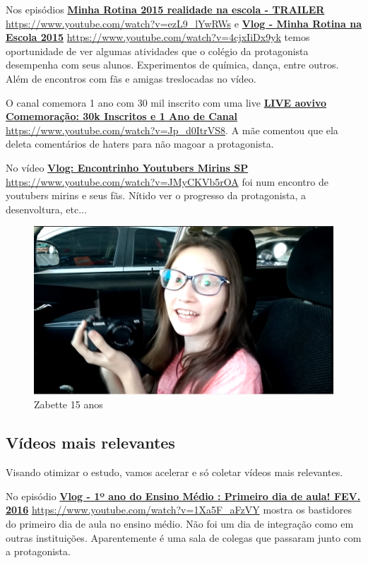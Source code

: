 Nos episódios \href{https://www.youtube.com/watch?v=ezL9_lYwRWs}{\textbf{Minha Rotina 2015 realidade na escola - TRAILER}} \url{https://www.youtube.com/watch?v=ezL9_lYwRWs} e \href{https://www.youtube.com/watch?v=4cjxIiDx9yk}{\textbf{Vlog - Minha Rotina na Escola 2015}} \url{https://www.youtube.com/watch?v=4cjxIiDx9yk} temos oportunidade de ver algumas atividades que o colégio da protagonista desempenha com seus alunos. Experimentos de química, dança, entre outros. Além de encontros com fãs e amigas treslocadas no vídeo.

O canal comemora 1 ano com 30 mil inscrito com uma live \href{https://www.youtube.com/watch?v=Jp_d0ItrVS8}{\textbf{LIVE aovivo Comemoração: 30k Inscritos e 1 Ano de Canal}} \url{https://www.youtube.com/watch?v=Jp_d0ItrVS8}. A mãe comentou que ela deleta comentários de haters para não magoar a protagonista.

No vídeo \href{https://www.youtube.com/watch?v=JMyCKVb5rOA}{\textbf{Vlog: Encontrinho Youtubers Mirins SP}} \url{https://www.youtube.com/watch?v=JMyCKVb5rOA} foi num encontro de youtubers mirins e seus fãs. Nítido ver o progresso da protagonista, a desenvoltura, etc...

\begin{figure}[h!]
    \centering
    \includegraphics[width=0.7\linewidth]{fig/Zabetta-15-anos}
    \caption{Zabette 15 anos}
    \label{fig:zabetta-15-anos}
\end{figure}


\subsection{Vídeos mais relevantes}

Visando otimizar o estudo, vamos acelerar e só coletar vídeos mais relevantes.

No episódio \href{https://www.youtube.com/watch?v=1Xa5F_aFzVY}{\textbf{Vlog - 1º ano do Ensino Médio : Primeiro dia de aula! FEV. 2016}} \url{https://www.youtube.com/watch?v=1Xa5F_aFzVY} mostra os bastidores do primeiro dia de aula no ensino médio. Não foi um dia de integração como em outras instituições. Aparentemente é uma sala de colegas que passaram junto com a protagonista.

